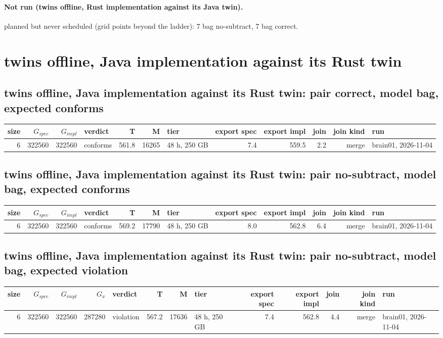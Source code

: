 \documentclass[10pt]{article}
\begin{document}
\paragraph{Not run (twins offline, Rust implementation against its Java twin).}
planned but never scheduled (grid points beyond the ladder): 7 bag no-subtract, 7 bag correct.\par
\section*{twins offline, Java implementation against its Rust twin}
\subsection*{twins offline, Java implementation against its Rust twin: pair \textsf{correct}, model bag, expected conforms}
\begin{longtable}{@{}rrrlrrlrrrrl@{}}
\toprule
size & $G_{\mathit{spec}}$ & $G_{\mathit{impl}}$ & verdict & T & M & tier & export spec & export impl & join & join kind & run \\
\midrule
\endhead
\color{blue} 6 & 322560 & 322560 & conforms & 561.8 & 16265 & 48 h, 250 GB & 7.4 & 559.5 & 2.2 & merge & brain01, 2026-11-04 \\
\bottomrule
\end{longtable}
\subsection*{twins offline, Java implementation against its Rust twin: pair \textsf{no-subtract}, model bag, expected conforms}
\begin{longtable}{@{}rrrlrrlrrrrl@{}}
\toprule
size & $G_{\mathit{spec}}$ & $G_{\mathit{impl}}$ & verdict & T & M & tier & export spec & export impl & join & join kind & run \\
\midrule
\endhead
\color{blue} 6 & 322560 & 322560 & conforms & 569.2 & 17790 & 48 h, 250 GB & 8.0 & 562.8 & 6.4 & merge & brain01, 2026-11-04 \\
\bottomrule
\end{longtable}
\subsection*{twins offline, Java implementation against its Rust twin: pair \textsf{no-subtract}, model bag, expected violation}
\begin{longtable}{@{}rrrrlrrlrrrrl@{}}
\toprule
size & $G_{\mathit{spec}}$ & $G_{\mathit{impl}}$ & $G_x$ & verdict & T & M & tier & export spec & export impl & join & join kind & run \\
\midrule
\endhead
\color{blue} 6 & 322560 & 322560 & 287280 & violation & 567.2 & 17636 & 48 h, 250 GB & 7.4 & 562.8 & 4.4 & merge & brain01, 2026-11-04 \\
\bottomrule
\end{longtable}
\end{document}
